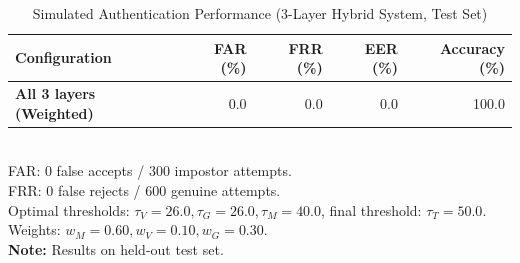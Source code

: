 \begin{table}[h]
\centering
\caption{Simulated Authentication Performance (3-Layer Hybrid System, Test Set)}
\label{tab:results}
\scriptsize
\begin{tabular}{lrrrr}
\toprule
\textbf{Configuration} & \textbf{FAR (\%)} & \textbf{FRR (\%)} & \textbf{EER (\%)} & \textbf{Accuracy (\%)} \\
\midrule
\textbf{All 3 layers (Weighted)} & 0.0 & 0.0 & 0.0 & 100.0 \\
\bottomrule
\end{tabular}
\\[2pt]
\scriptsize FAR: 0 false accepts / 300 impostor attempts.\\
\scriptsize FRR: 0 false rejects / 600 genuine attempts.\\
\scriptsize Optimal thresholds: $\tau_V=26.0, \tau_G=26.0, \tau_M=40.0$, final threshold: $\tau_T=50.0$.\\
\scriptsize Weights: $w_M=0.60, w_V=0.10, w_G=0.30$.\\
\scriptsize \textbf{Note:} Results on held-out test set.
\end{table}
